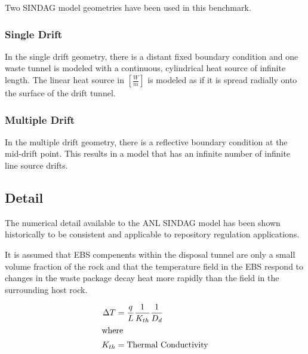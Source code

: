 \documentclass{anstrans}
\begin{document}
Two \gls{SINDAG} model geometries have been used in this benchmark.  

\subsubsection{Single Drift}

In the single drift geometry, there is a distant fixed boundary condition and 
one waste tunnel is modeled with a continuous, cylindrical heat source of 
infinite length. The linear heat source in $[\frac{W}{m}]$ is modeled as if it 
is spread radially onto the surface of the drift tunnel. 

\subsubsection{Multiple Drift}

In the multiple drift geometry, there is a reflective boundary condition at the 
mid-drift point. This results in a model that has an infinite number of infinite 
line source drifts.

\subsection{Detail}

The numerical detail available to the \gls{ANL} \gls{SINDAG} model has been 
shown historically to be consistent and applicable to repository regulation 
applications.













It is assumed that \gls{EBS} compenents within the disposal tunnel are only a 
small volume fraction of the rock and that the temperature field in the \gls{EBS} 
respond to changes in the waste package decay heat more rapidly than the field 
in the surrounding host rock.

\begin{align}
  \Delta T &= \frac{q}{L} \frac{1}{K_{th}}\frac{1}{D_d}\\
  \intertext{where}
  K_{th} &= \mbox{Thermal Conductivity}
  \label{deltat}
\end{align}
\end{document}
